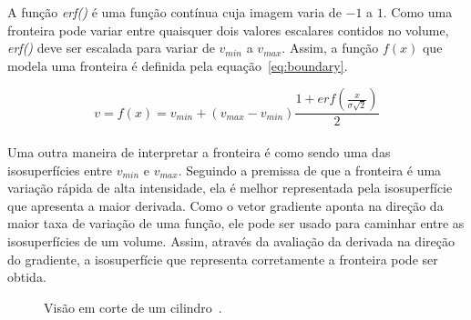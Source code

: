 	A função \textit{erf()} é uma função contínua cuja imagem varia de $-1$ a $1$. Como uma fronteira pode variar entre quaisquer dois valores escalares contidos no volume, \textit{erf()} deve ser escalada para variar de $v_{min}$ a $v_{max}$. Assim, a função $f(x)$ que modela uma fronteira é definida pela equação~\eqref{eq:boundary}.

\begin{equation} \label{eq:boundary}
	v = f(x) = v_{min} + (v_{max} - v_{min}) \frac{1 + erf(\frac{x}{\sigma\sqrt{2}})}{2}
\end{equation} \\

	Uma outra maneira de interpretar a fronteira é como sendo uma das isosuperfícies entre $v_{min}$ e $v_{max}$. Seguindo a premissa de que a fronteira é uma variação rápida de alta intensidade, ela é melhor representada pela isosuperfície que apresenta a maior derivada. Como o vetor gradiente aponta na direção da maior taxa de variação de uma função, ele pode ser usado para caminhar entre as isosuperfícies de um volume. Assim, através da avaliação da derivada na direção do gradiente, a isosuperfície que representa corretamente a fronteira pode ser obtida.
	
\begin{figure}[h]
	\centering
	\caption{Visão em corte de um cilindro~\cite{gordon}.}
	\label{fig:g_isosurfaces}
\end{figure}

